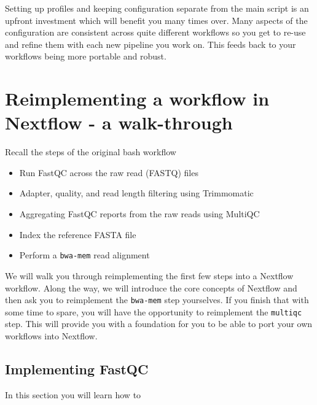 \begin{note}
Setting up profiles and keeping configuration separate from the main script is an upfront investment
which will benefit you many times over. Many aspects of the configuration are consistent across quite different workflows 
so you get to re-use and refine them with each new pipeline you work on. This feeds back to your workflows being more portable and robust. 
\end{note}


\section{Reimplementing a workflow in Nextflow - a walk-through}

Recall the steps of the original bash workflow

\begin{itemize}
  \item Run FastQC across the raw read (FASTQ) files
  \item Adapter, quality, and read length filtering using Trimmomatic
  \item Aggregating FastQC reports from the raw reads using MultiQC
  \item Index the reference FASTA file
  \item Perform a \texttt{bwa-mem} read alignment
\end{itemize}

We will walk you through reimplementing the first few steps 
into a Nextflow workflow. Along the way, we will introduce the core concepts of Nextflow 
and then ask you to reimplement the \texttt{bwa-mem} step yourselves. 
If you finish that with some time to spare, you will have the opportunity to reimplement the \texttt{multiqc} step. 
This will provide you with a foundation for you to be able to port your own workflows into Nextflow. 



\subsection{Implementing FastQC}

In this section you will learn how to 

